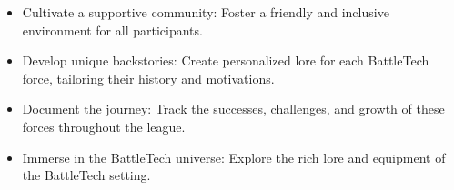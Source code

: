 \begin{itemize}
    \item Cultivate a supportive community: Foster a friendly and inclusive environment for all participants.

    \item Develop unique backstories: Create personalized lore for each BattleTech force, tailoring their history and motivations.

    \item Document the journey: Track the successes, challenges, and growth of these forces throughout the league.

    \item Immerse in the BattleTech universe: Explore the rich lore and equipment of the BattleTech setting.
\end{itemize}
